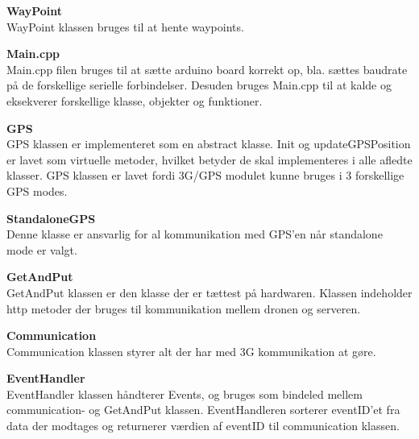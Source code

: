 \textbf{WayPoint} \\
WayPoint klassen bruges til at hente waypoints.  

\textbf{Main.cpp} \\
Main.cpp filen bruges til at sætte arduino board korrekt op, bla. sættes baudrate på de forskellige serielle forbindelser. Desuden bruges Main.cpp til at kalde og eksekverer forskellige klasse, objekter og funktioner.

\textbf{GPS} \\
GPS klassen er implementeret som en abstract klasse. Init og updateGPSPosition er lavet som virtuelle metoder, hvilket betyder de skal implementeres i alle afledte klasser. GPS klassen er lavet fordi 3G/GPS modulet kunne bruges i 3 forskellige GPS modes. 

\textbf{StandaloneGPS}\\
Denne klasse er ansvarlig for al kommunikation med GPS'en når standalone mode er valgt. 

\textbf{GetAndPut} \\
GetAndPut klassen er den klasse der er tættest på hardwaren. Klassen indeholder http metoder der bruges til kommunikation mellem dronen og serveren. 

\textbf{Communication} \\
Communication klassen styrer alt der har med 3G kommunikation at gøre.

\textbf{EventHandler} \\
EventHandler klassen håndterer Events, og bruges som bindeled mellem communication- og GetAndPut klassen. EventHandleren sorterer eventID'et fra data der modtages og returnerer værdien af eventID til communication klassen. 

\newpage


